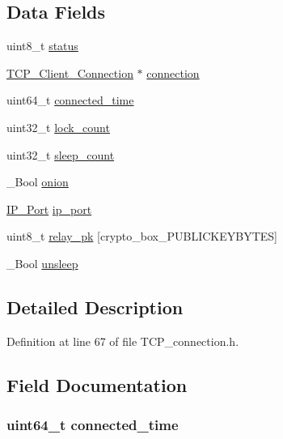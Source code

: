 \subsection*{Data Fields}
\begin{DoxyCompactItemize}
\item 
uint8\+\_\+t \hyperlink{struct_t_c_p__con_ade818037fd6c985038ff29656089758d}{status}
\item 
\hyperlink{struct_t_c_p___client___connection}{T\+C\+P\+\_\+\+Client\+\_\+\+Connection} $\ast$ \hyperlink{struct_t_c_p__con_a8ef08da0aa71c2a8a8d8bec587521844}{connection}
\item 
uint64\+\_\+t \hyperlink{struct_t_c_p__con_ae8be4bcb970c4f212e92c8f1598a1c41}{connected\+\_\+time}
\item 
uint32\+\_\+t \hyperlink{struct_t_c_p__con_af2d7f68891e20ea9070cfc2d412867e1}{lock\+\_\+count}
\item 
uint32\+\_\+t \hyperlink{struct_t_c_p__con_aa67ab512ed25830e7b9ea3c7069a9555}{sleep\+\_\+count}
\item 
\+\_\+\+Bool \hyperlink{struct_t_c_p__con_a4f1449619f7a2b76af07277f10bd0f93}{onion}
\item 
\hyperlink{struct_i_p___port}{I\+P\+\_\+\+Port} \hyperlink{struct_t_c_p__con_a86e2a5a56c0dd22df6e8b8a10e40f9e4}{ip\+\_\+port}
\item 
uint8\+\_\+t \hyperlink{struct_t_c_p__con_afd26506e572bfd335a3e7b498acd2902}{relay\+\_\+pk} \mbox{[}crypto\+\_\+box\+\_\+\+P\+U\+B\+L\+I\+C\+K\+E\+Y\+B\+Y\+T\+E\+S\mbox{]}
\item 
\+\_\+\+Bool \hyperlink{struct_t_c_p__con_a32a5683291c18bbe710881445071d607}{unsleep}
\end{DoxyCompactItemize}


\subsection{Detailed Description}


Definition at line 67 of file T\+C\+P\+\_\+connection.\+h.



\subsection{Field Documentation}
\hypertarget{struct_t_c_p__con_ae8be4bcb970c4f212e92c8f1598a1c41}{
\subsubsection[{connected\+\_\+time}]{\setlength{\rightskip}{0pt plus 5cm}uint64\+\_\+t connected\+\_\+time}}\label{struct_t_c_p__con_ae8be4bcb970c4f212e92c8f1598a1c41}


